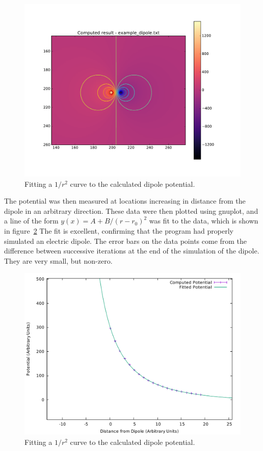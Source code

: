\begin{figure}[h]
	\centering
	\center
	\includegraphics[width=1.1\linewidth]{dipole_contours.pdf}
	\caption{Fitting a $1/r^2$ curve to the calculated dipole potential.} \label{fig:dipole-cont}
	\end{figure}

The potential was then measured at locations increasing in distance from the dipole in an arbitrary direction.
These data were then plotted using gnuplot, and a line of the form $y(x) = A + B / (r-r_0)^2$ was fit to the
data, which is shown in figure~\ref{fig:dipole-fit} The fit is excellent, confirming that the program had properly simulated an electric dipole. The error
bars on the data points come from the difference between successive iterations at the end of the simulation of
the dipole. They are very small, but non-zero.



	\begin{figure}[h]
	\centering
	\includegraphics[width=\linewidth]{dipole_fit.pdf}
	\caption{Fitting a $1/r^2$ curve to the calculated dipole potential.} \label{fig:dipole-fit}
	\end{figure}

